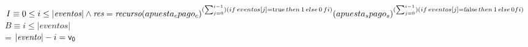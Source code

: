 \documentclass[10pt,a4paper]{article}
\begin{document}
\begin{enumerate}
        
        $I \equiv 0 \leq i \leq |{\textit{eventos}}\vert \land \\
        \textit{res} = \textit{recurso}(\textit{$apuesta_{c}$}\textit{$pago_{c}$})^{(\sum_{j = 0}^{i -1})(if \hspace{0.5mm} eventos[j] = \mathrm{true} \hspace{0.5mm} then \hspace{0.5mm} 1 \hspace{0.5mm} else \hspace{0.5mm} 0 \hspace{0.5mm} fi)}
        (\textit{$apuesta_{s}$}\textit{$pago_{s}$})^{(\sum_{j = 0}^{i -1})(if \hspace{0.5mm} eventos[j] = \mathrm{false} \hspace{0.5mm} then  \hspace{0.5mm} 1  \hspace{0.5mm} else \hspace{0.5mm} 0 fi)}$\\
        $B \equiv i \leq |\textit{eventos}\vert$\\
       \funcionDecresiente= $|\textit{evento}\vert - i = \mathsf{v_{0}}$\\



\end{enumerate}
\end{document}
